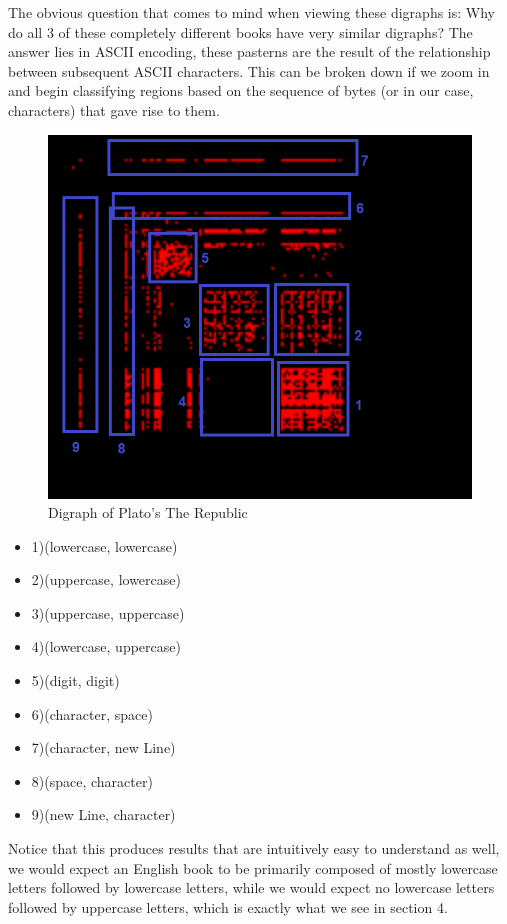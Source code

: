 \documentclass[12pt,a4paper]{article}
\begin{document}
\pagebreak
The obvious question that comes to mind when viewing these digraphs is: Why do all 3 of these completely different books have very similar digraphs? The answer lies in ASCII encoding, these pasterns are the result of the relationship between subsequent ASCII characters. This can be broken down if we zoom in and begin classifying regions based on the sequence of bytes (or in our case, characters) that gave rise to them. 
\linebreak
\begin{minipage}{0.6\textwidth}
	\begin{figure}[H]
		\includegraphics[scale=0.45]{images/RepublicZoom.png} 
		\caption{Digraph of Plato's The Republic}
	\end{figure}
\end{minipage} \hfill
\begin{minipage}{0.45\textwidth}
	\begin{itemize}
		\item 1)(lowercase, lowercase)
		\item 2)(uppercase, lowercase)
		\item 3)(uppercase, uppercase)
		\item 4)(lowercase, uppercase)
		\item 5)(digit, digit)
		\item 6)(character, space)
		\item 7)(character, new Line)
		\item 8)(space, character)
		\item 9)(new Line, character)
	\end{itemize}
\end{minipage}
\linebreak\linebreak\linebreak
Notice that this produces results that are intuitively easy to understand as well, we would expect an English book to be primarily composed of mostly lowercase letters followed by lowercase letters, while we would expect no lowercase letters followed by uppercase letters, which is exactly what we see in section 4. 
\end{document}
